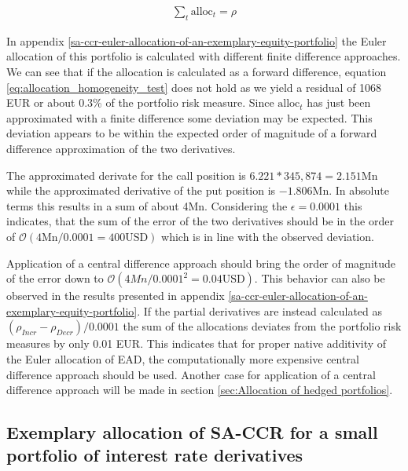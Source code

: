\documentclass[../Thesis_AHoecherl.tex]{subfiles}
\begin{document}
    \begin{align}
        \label{eq:allocation_homogeneity_test}
        \sum_t{\text{alloc}_t} = \rho
    \end{align}
    
    
    In appendix \ref{sa-ccr-euler-allocation-of-an-exemplary-equity-portfolio} the Euler allocation of this portfolio is calculated with different finite difference approaches. We can see that if the allocation is calculated as a forward difference, equation \ref{eq:allocation_homogeneity_test} does not hold as we yield a residual of 1068 EUR or about 0.3\% of the portfolio risk measure. Since $\text{alloc}_t$ has just been approximated with a finite difference some deviation may be expected. This deviation appears to be within the expected order of magnitude of a forward difference approximation of the two derivatives.

    The approximated derivate for the call position is $6.221 * 345,874 = 2.151 \text{Mn}$ while the approximated derivative of the put position is $-1.806 \text{Mn}$. 
    In absolute terms this results in a sum of about 4Mn. Considering the $\epsilon = 0.0001$ this indicates, that the sum of the error of the two derivatives should be in the order of $\mathcal{O}\left(4\text{Mn}/0.0001 = 400 \text{USD}\right)$ which is in line with the observed deviation.

    Application of a central difference approach should bring the order of magnitude of the error down to $\mathcal{O}\left(4Mn/0.0001^2 = 0.04 \text{USD}\right)$.
     This behavior can also be observed in the results presented in appendix \ref{sa-ccr-euler-allocation-of-an-exemplary-equity-portfolio}. 
    If the partial derivatives are instead calculated as $(\rho_{Incr}-\rho_{Decr})/0.0001$ the sum of the allocations deviates from the portfolio risk measures by only 0.01 EUR. 
    This indicates that for proper native additivity of the Euler allocation of EAD, the computationally more expensive central difference approach should be used.
    Another case for application of a central difference approach will be made in section \ref{sec:Allocation of hedged portfolios}.

    \subsection{Exemplary allocation of SA-CCR for a small portfolio of interest rate derivatives\label{sec:Exemplary allocation of SA-CCR for a small portfolio of interst rate derivatives}}
\end{document}
